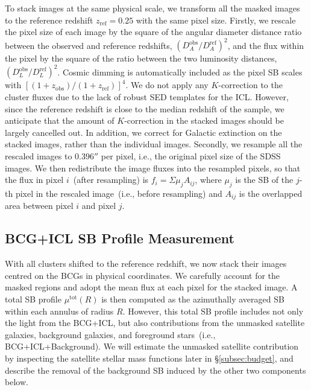 \documentclass[fleqn,usenatbib]{mnras}
\begin{document}
To stack images at the same physical scale, we transform all the masked
images to the reference redshift $z_{\mathrm{ref}}{=}0.25$ with the same
pixel size. Firstly, we rescale the pixel size of each image by the square
of the angular diameter distance ratio between the observed and reference
redshifts, $(D_A^{\mathrm{obs}}/D_A^{\mathrm{ref}})^2$, and the flux within
the pixel by the square of the ratio between the two luminosity distances,
$(D_L^{\mathrm{obs}}/D_L^{\mathrm{ref}})^{2}$. Cosmic dimming is
automatically included as the pixel SB scales with
$[(1+z_{\mathrm{obs}})/(1+z_{\mathrm{ref}})]^4$. We do not apply any
$K$-correction to the cluster fluxes due to the lack of robust SED
templates for the ICL. However, since the reference redshift is close to
the median redshift of the sample, we anticipate that the amount of
$K$-correction in the stacked images should be largely cancelled out. In
addition, we correct for Galactic extinction on the stacked images, rather
than the individual images. Secondly, we resample all the rescaled images
to $0.396''$ per pixel, i.e., the original pixel size of the SDSS images.
We then redistribute the image fluxes into the resampled pixels, so that
the flux in pixel $i$~(after resampling) is $f_i{=}\Sigma \mu_j A_{ij}$,
where $\mu_j$ is the SB of the $j$-th pixel in the rescaled image~(i.e.,
before resampling) and $A_{ij}$ is the overlapped area between pixel $i$
and pixel $j$.


\subsection{BCG+ICL SB Profile Measurement}
\label{subsec:sbprofile}

With all clusters shifted to the reference redshift, we now stack their
images centred on the BCGs in physical coordinates. We carefully account
for the masked regions and adopt the mean flux at each pixel for the
stacked image. A total SB profile $\mu^{\mathrm{tot}}(R)$ is then computed as the
azimuthally averaged SB within each annulus of radius $R$. However, this
total SB profile includes not only the light from the BCG+ICL, but also
contributions from the unmasked satellite galaxies, background galaxies,
and foreground stars~(i.e., BCG+ICL+Background). We will estimate the
unmasked satellite contribution by inspecting the satellite stellar mass
functions later in \S\ref{subsec:budget}, and describe the removal of the
background SB induced by the other two components below.
\end{document}
